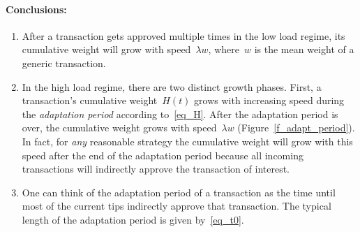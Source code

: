 \documentclass[12pt]{article}
\begin{document}
\begin{CJK}{UTF8}{bkai}
\paragraph{Conclusions:}
\begin{enumerate}
 \item After a transaction gets approved multiple times 
 in the low load regime, 
its cumulative weight will grow 
with speed~$\lambda w$, where~$w$ is the mean weight
of a generic transaction.
 \item In the high load regime, there are two distinct growth 
 phases. First, a transaction's 
cumulative weight~$H(t)$ grows with increasing
speed during the \emph{adaptation period}
according to~\eqref{eq_H}. After
the adaptation period is over, the cumulative weight grows 
with speed~$\lambda w$ (Figure~\ref{f_adapt_period}).
In fact, for \emph{any} reasonable strategy the cumulative
weight will grow with this speed after the end
of the adaptation period because 
all incoming transactions will indirectly approve  
the transaction of interest.
 \item One can think of the adaptation period of a 
 transaction as the time until most of the current tips indirectly
approve that transaction. The typical length of the 
adaptation period is given by~\eqref{eq_t0}.
\end{enumerate}



\end{CJK}
\end{document}
